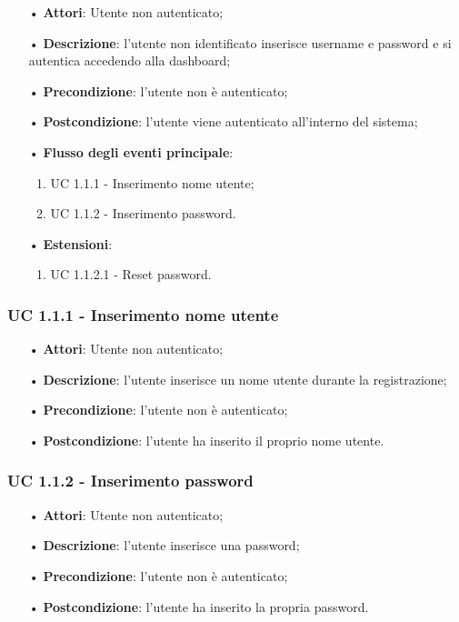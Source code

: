 \begin{itemize}
\item[•]\textbf{Attori}: Utente non autenticato;
\item[•]\textbf{Descrizione}:  l’utente non identificato inserisce username e password e si autentica accedendo alla dashboard;
\item[•]\textbf{Precondizione}: l’utente non è autenticato;
\item[•]\textbf{Postcondizione}: l’utente viene autenticato all’interno del sistema;
\item[•]\textbf{Flusso degli eventi principale}:
\begin{enumerate}
\item UC 1.1.1 - Inserimento nome utente;
\item UC 1.1.2 - Inserimento password.
\end{enumerate}
\item[•]\textbf{Estensioni}:
\begin{enumerate}
\item UC 1.1.2.1 - Reset password.

\end{enumerate}
\end{itemize}

\subsubsection{UC 1.1.1 - Inserimento nome utente}
\begin{itemize}
\item[•]\textbf{Attori}: Utente non autenticato;
\item[•]\textbf{Descrizione}: l’utente inserisce un nome utente durante la registrazione;
\item[•]\textbf{Precondizione}: l’utente non è autenticato;
\item[•]\textbf{Postcondizione}: l’utente ha inserito il proprio nome utente.
\end{itemize}

\subsubsection{UC 1.1.2 - Inserimento password}
\begin{itemize}
\item[•]\textbf{Attori}: Utente non autenticato;
\item[•]\textbf{Descrizione}: l’utente inserisce una password;
\item[•]\textbf{Precondizione}: l'utente non è autenticato;
\item[•]\textbf{Postcondizione}: l'utente ha inserito la propria password.
\end{itemize}

